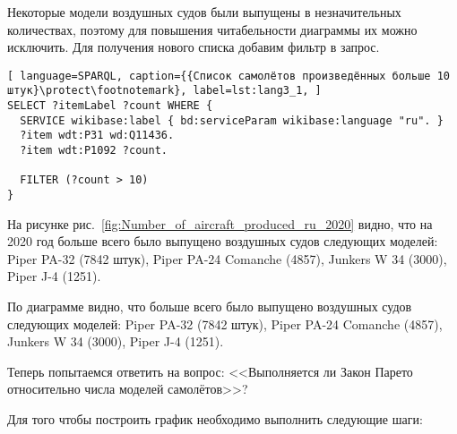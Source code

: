 
Некоторые модели воздушных судов были выпущены в незначительных количествах, поэтому для повышения читабельности диаграммы их можно исключить. Для получения нового списка добавим фильтр в запрос.

\begin{lstlisting}[ language=SPARQL, caption={{Список самолётов произведённых больше 10 штук}\protect\footnotemark}, label=lst:lang3_1, ]
SELECT ?itemLabel ?count WHERE {
  SERVICE wikibase:label { bd:serviceParam wikibase:language "ru". }
  ?item wdt:P31 wd:Q11436.
  ?item wdt:P1092 ?count.
  
  FILTER (?count > 10)
}
\end{lstlisting}



На рисунке рис.~\ref{fig:Number_of_aircraft_produced_ru_2020} видно, что на 2020 год больше всего было выпущено воздушных судов следующих моделей: Piper PA-32 (\num{7842} штук), Piper PA-24 Comanche (\num{4857}), Junkers W 34 (\num{3000}), Piper J-4 (\num{1251}).


\begin{figure*}[h]

    \setlength{\fboxsep}{0pt}%
    \setlength{\fboxrule}{1pt}%

	\caption{Количество выпущенных воздушных судов по моделям, 2020.}%
    \label{fig:Number_of_aircraft_produced_ru_2020}%
\end{figure*}

По диаграмме видно, что больше всего было выпущено воздушных судов следующих моделей: Piper PA-32 (\num{7842} штук), Piper PA-24 Comanche (\num{4857}), Junkers W 34 (\num{3000}), Piper J-4 (\num{1251}).

Теперь попытаемся ответить на вопрос: <<Выполняется ли Закон Парето относительно числа моделей самолётов>>?

Для того чтобы построить график необходимо выполнить следующие шаги:

